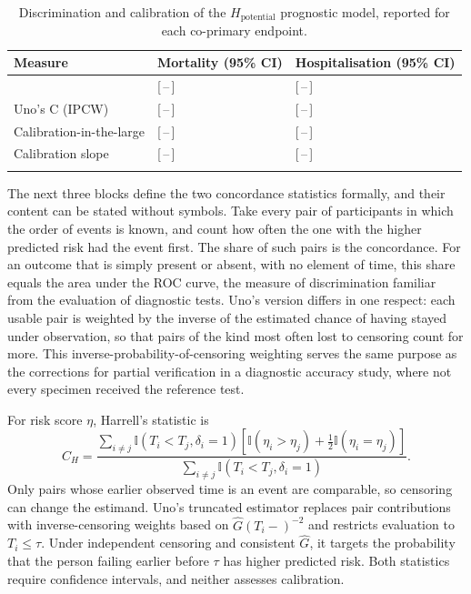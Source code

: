 \begin{table}[htbp]
\centering
\caption{Discrimination and calibration of the $H_{\text{potential}}$ prognostic model, reported for each co-primary endpoint.}
\label{tab:discrimination}
\footnotesize
\renewcommand{\arraystretch}{1.2}
\begin{tabular}{p{5.6cm} p{3.6cm} p{3.6cm}}
\toprule
\textbf{Measure} & \textbf{Mortality (95\% CI)} & \textbf{Hospitalisation (95\% CI)} \\
\midrule
\hprows{discrimination}{%
Harrell's C \citep{harrell_1996} & [\,--\,] & [\,--\,] \\
Uno's C (IPCW) & [\,--\,] & [\,--\,] \\
Calibration-in-the-large & [\,--\,] & [\,--\,] \\
Calibration slope & [\,--\,] & [\,--\,] \\
}
\bottomrule
\end{tabular}
\end{table}

The next three blocks define the two concordance statistics formally, and their content can be stated without symbols. Take every pair of participants in which the order of events is known, and count how often the one with the higher predicted risk had the event first. The share of such pairs is the concordance. For an outcome that is simply present or absent, with no element of time, this share equals the area under the ROC curve, the measure of discrimination familiar from the evaluation of diagnostic tests. Uno's version differs in one respect: each usable pair is weighted by the inverse of the estimated chance of having stayed under observation, so that pairs of the kind most often lost to censoring count for more. This inverse-probability-of-censoring weighting serves the same purpose as the corrections for partial verification in a diagnostic accuracy study, where not every specimen received the reference test.

\begin{derivation}
\label{der:concordance}
For risk score $\eta$, Harrell's statistic is
\[
 \widehat C_H=\frac{\sum_{i\ne j}\mathbb I(T_i<T_j,\delta_i=1)
 [\mathbb I(\eta_i>\eta_j)+\tfrac12\mathbb I(\eta_i=\eta_j)]}
 {\sum_{i\ne j}\mathbb I(T_i<T_j,\delta_i=1)}.
\]
Only pairs whose earlier observed time is an event are comparable, so censoring
can change the estimand. Uno's truncated estimator replaces pair contributions
with inverse-censoring weights based on $\widehat G(T_i-)^{-2}$ and restricts
evaluation to $T_i\leq\tau$. Under independent censoring and consistent
$\widehat G$, it targets the probability that the person failing earlier before
$\tau$ has higher predicted risk. Both statistics require confidence intervals,
and neither assesses calibration.
\end{derivation}

